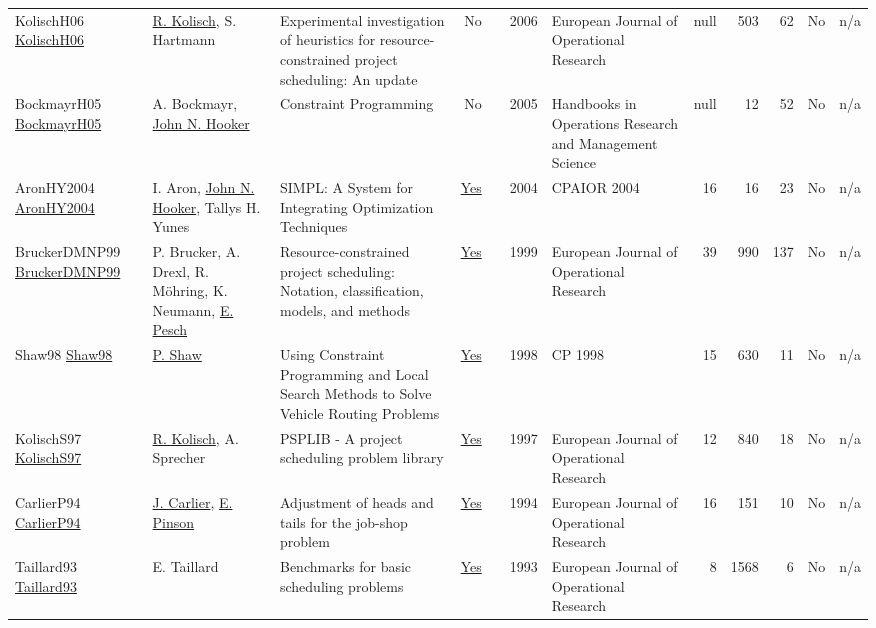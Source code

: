 {\begin{longtable}{>{\raggedright\arraybackslash}p{3cm}>{\raggedright\arraybackslash}p{6cm}>{\raggedright\arraybackslash}p{6.5cm}rrrp{2.5cm}rrrrr}
KolischH06 \href{http://dx.doi.org/10.1016/j.ejor.2005.01.065}{KolischH06} & \hyperref[auth:a447]{R. Kolisch}, S. Hartmann & Experimental investigation of heuristics for resource-constrained project scheduling: An update & No & \cite{KolischH06} & 2006 & European Journal of Operational Research & null & 503 & 62 & No & n/a\\
BockmayrH05 \href{http://dx.doi.org/10.1016/s0927-0507(05)12010-6}{BockmayrH05} & A. Bockmayr, \hyperref[auth:a162]{John N. Hooker} & Constraint Programming & No & \cite{BockmayrH05} & 2005 & Handbooks in Operations Research and Management Science & null & 12 & 52 & No & n/a\\
AronHY2004 \href{http://dx.doi.org/10.1007/978-3-540-24664-0_2}{AronHY2004} & I. Aron, \hyperref[auth:a162]{John N. Hooker}, Tallys H. Yunes & SIMPL: A System for Integrating Optimization Techniques & \href{works/AronHY2004.pdf}{Yes} & \cite{AronHY2004} & 2004 & CPAIOR 2004 & 16 & 16 & 23 & No & n/a\\
BruckerDMNP99 \href{http://dx.doi.org/10.1016/s0377-2217(98)00204-5}{BruckerDMNP99} & P. Brucker, A. Drexl, R. M\"{o}hring, K. Neumann, \hyperref[auth:a445]{E. Pesch} & Resource-constrained project scheduling: Notation,  classification,  models,  and methods & \href{works/BruckerDMNP99.pdf}{Yes} & \cite{BruckerDMNP99} & 1999 & European Journal of Operational Research & 39 & 990 & 137 & No & n/a\\
Shaw98 \href{https://doi.org/10.1007/3-540-49481-2\_30}{Shaw98} & \hyperref[auth:a120]{P. Shaw} & Using Constraint Programming and Local Search Methods to Solve Vehicle Routing Problems & \href{works/Shaw98.pdf}{Yes} & \cite{Shaw98} & 1998 & CP 1998 & 15 & 630 & 11 & No & n/a\\
KolischS97 \href{http://dx.doi.org/10.1016/s0377-2217(96)00170-1}{KolischS97} & \hyperref[auth:a447]{R. Kolisch}, A. Sprecher & PSPLIB - A project scheduling problem library & \href{works/KolischS97.pdf}{Yes} & \cite{KolischS97} & 1997 & European Journal of Operational Research & 12 & 840 & 18 & No & n/a\\
CarlierP94 \href{http://dx.doi.org/10.1016/0377-2217(94)90379-4}{CarlierP94} & \hyperref[auth:a858]{J. Carlier}, \hyperref[auth:a859]{E. Pinson} & Adjustment of heads and tails for the job-shop problem & \href{works/CarlierP94.pdf}{Yes} & \cite{CarlierP94} & 1994 & European Journal of Operational Research & 16 & 151 & 10 & No & n/a\\
Taillard93 \href{http://dx.doi.org/10.1016/0377-2217(93)90182-m}{Taillard93} & E. Taillard & Benchmarks for basic scheduling problems & \href{works/Taillard93.pdf}{Yes} & \cite{Taillard93} & 1993 & European Journal of Operational Research & 8 & 1568 & 6 & No & n/a\\

\end{longtable}}
